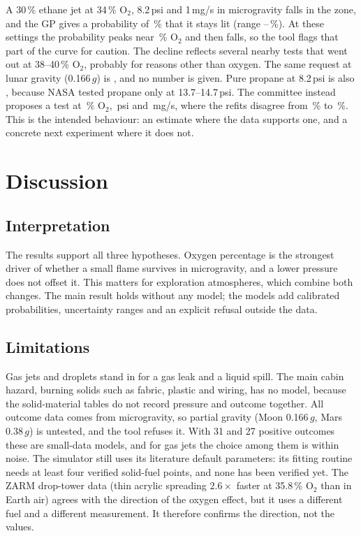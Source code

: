 \documentclass[11pt,twocolumn]{article}
\newcommand{\Otwo}{\ensuremath{\mathrm{O_2}}}
\newcommand{\pct}{\,\%}
\begin{document}
A 30\pct{} ethane jet at 34\pct{} \Otwo, 8.2\,psi and 1\,mg/s in microgravity falls in the \emph{\MoonZone}
zone, and the GP gives a probability of \MoonP\pct{} that it stays lit (range \MoonLow--\MoonHigh\pct). At
these settings the probability peaks near \MoonPeak\pct{} \Otwo{} and then falls, so the tool flags that part
of the curve for caution. The decline reflects several nearby tests that went out at 38--40\pct{} \Otwo,
probably for reasons other than oxygen. The same request at lunar gravity (0.166\,$g$) is
\emph{\MoonGZone}, and no number is given. Pure propane at 8.2\,psi is also \emph{\PropZone}, because NASA
tested propane only at 13.7--14.7\,psi. The committee instead proposes a test at \NextOtwo\pct{} \Otwo,
\NextPsi\,psi and \NextFlow\,mg/s, where the refits disagree from \NextLow\pct{} to \NextHigh\pct. This is
the intended behaviour: an estimate where the data supports one, and a concrete next experiment where it
does not.

\section{Discussion}

\subsection{Interpretation}

The results support all three hypotheses. Oxygen percentage is the strongest driver of whether a small
flame survives in microgravity, and a lower pressure does not offset it. This matters for exploration
atmospheres, which combine both changes. The main result holds without any model; the models add
calibrated probabilities, uncertainty ranges and an explicit refusal outside the data.

\subsection{Limitations}

Gas jets and droplets stand in for a gas leak and a liquid spill. The main cabin hazard, burning solids such
as fabric, plastic and wiring, has no model, because the solid-material tables do not record pressure and
outcome together. All outcome data comes from microgravity, so partial gravity (Moon 0.166\,$g$, Mars
0.38\,$g$) is untested, and the tool refuses it. With 31 and 27 positive outcomes these are small-data
models, and for gas jets the choice among them is within noise. The simulator still uses its literature
default parameters: its fitting routine needs at least four verified solid-fuel points, and none has been
verified yet. The ZARM drop-tower data (thin acrylic spreading $2.6\times$ faster at 35.8\pct{} \Otwo{} than
in Earth air) agrees with the direction of the oxygen effect, but it uses a different fuel and a different
measurement. It therefore confirms the direction, not the values.
\end{document}
